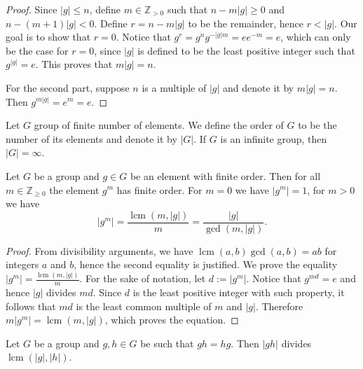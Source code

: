 \begin{proof}
  Since \(|g| \leq n\), define \(m \in \mathbb{Z}_{> 0}\) such that \(n - m |g|
  \geq 0\) and \(n - (m + 1) |g| < 0\). Define \(r = n - m |g|\) to be the
  remainder, hence \(r < |g|\). Our goal is to show that \(r = 0\). Notice that
  \(g^r = g^n g^{-|g| m} = e e^{-m} = e\), which can only be the case for \(r =
  0\), since \(|g|\) is defined to be the least positive integer such that
  \(g^{|g|} = e\). This proves that \(m |g| = n\).

  For the second part, suppose \(n\) is a multiple of \(|g|\) and denote it by
  \(m|g| = n\). Then \(g^{m |g|} = e^m = e\).
\end{proof}

\begin{definition}
  Let \(G\) group of finite number of elements. We define the order of \(G\) to
  be the number of its elements and denote it by \(|G|\). If \(G\) is an
  infinite group, then \(|G| = \infty\).
\end{definition}

\begin{proposition}
  Let \(G\) be a group and \(g \in G\) be an element with finite order. Then for
  all \(m \in \mathbb{Z}_{\geq 0}\) the element \(g^m\) has finite order. For
  \(m = 0\) we have \(|g^m| = 1\), for \(m > 0\) we have
  \[
    |g^m| = \frac{\operatorname{lcm}(m, |g|)}{m} =
    \frac{|g|}{\operatorname{gcd}(m, |g|)}.
  \]
\end{proposition}

\begin{proof}
  From divisibility arguments, we have \(\operatorname{lcm}(a, b)
  \operatorname{gcd}(a, b) = ab\) for integers \(a\) and \(b\), hence the second
  equality is justified. We prove the equality \(|g^m| =
  \frac{\operatorname{lcm}(m, |g|)} m\). For the sake of notation, let \(d :=
  |g^m|\). Notice that \(g^{m d} = e\) and hence \(|g|\) divides \(m d\). Since
  \(d\) is the least positive integer with such property, it follows that \(m
  d\) is the least common multiple of \(m\) and \(|g|\). Therefore \(m |g^m| =
  \operatorname{lcm}(m, |g|)\), which proves the equation.
\end{proof}

\begin{proposition}\label{prop: commutative-order-of-prod}
  Let \(G\) be a group and \(g, h \in G\) be such that \(g h = h g\). Then \(|g
  h|\) divides \(\operatorname{lcm}(|g|, |h|)\).
\end{proposition}

